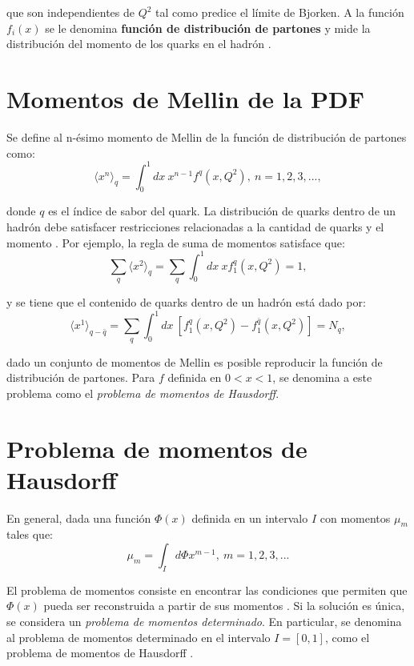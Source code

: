\documentclass[titlepage,11pt]{report}
\begin{document}
\noindent que son independientes de $Q^2$ tal como predice el límite de Bjorken. A la función $f_i(x)$ se le denomina \textbf{función de distribución de partones} y mide la distribución del momento de los quarks en el hadrón \cite{Lopez2025}. 

\section{Momentos de Mellin de la PDF}


Se define al n-ésimo momento de Mellin de la función de distribución de partones como:
\begin{equation*}
    \langle x^n\rangle_q=\int_0^{1}dx\ x^{n-1}f^{q}(x,Q^2),\ n=1,2,3, ...,
\end{equation*}

\noindent donde $q$ es el índice de sabor del quark. La distribución de quarks dentro de un hadrón debe satisfacer restricciones relacionadas a la cantidad de quarks y el momento \cite{Lopez2025}. Por ejemplo, la regla de suma de momentos satisface que:
\begin{equation*}
    \sum_{q}\langle x^2\rangle_q=\sum_{q}\int_0^{1}dx\ xf_1^{q}(x,Q^2)=1,
\end{equation*}

\noindent y se tiene que el contenido de quarks dentro de un hadrón está dado por:
\begin{equation*}
    \langle x^1\rangle_{q-\bar{q}}=\sum_{q}\int_0^{1}dx\ [f_1^{q}(x,Q^2)-f_1^{\bar{q}}(x,Q^2)]=N_{q},
\end{equation*}

\noindent dado un conjunto de momentos de Mellin es posible reproducir la función de distribución de partones. Para $f$ definida en $0<x<1$, se denomina a este problema como el \textit{problema de momentos de Hausdorff}.


\section{Problema de momentos de Hausdorff}

En general, dada una función $\Phi(x)$ definida en un intervalo $I$ con momentos $\mu_m$ tales que:
\begin{equation*}
    \mu_m=\int_Id\Phi x^{m-1},\ m=1,2,3, ...
\end{equation*}

El problema de momentos consiste en encontrar las condiciones que permiten que $\Phi(x)$ pueda ser reconstruida a partir de sus momentos \cite{alma99671493502466}. Si la solución es única, se considera un \textit{problema de momentos determinado}. En particular, se denomina al problema de momentos determinado en el intervalo $I=[0,1]$, como el problema de momentos de Hausdorff \cite{Hausdorff1923}. \\
\end{document}
